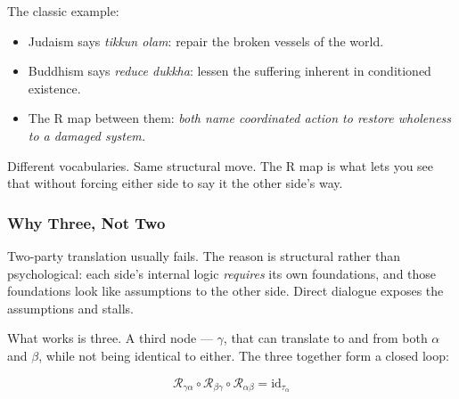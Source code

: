 \documentclass[
]{article}
\providecommand{\tightlist}{%
  \setlength{\itemsep}{0pt}\setlength{\parskip}{0pt}}
\begin{document}
The classic example:

\begin{itemize}
\tightlist
\item
  Judaism says \emph{tikkun olam}: repair the broken vessels of the
  world.
\item
  Buddhism says \emph{reduce dukkha}: lessen the suffering inherent in
  conditioned existence.
\item
  The R map between them: \emph{both name coordinated action to restore
  wholeness to a damaged system.}
\end{itemize}

Different vocabularies. Same structural move. The R map is what lets you
see that without forcing either side to say it the other side's way.

\subsubsection{Why Three, Not Two}\label{why-three-not-two}

Two-party translation usually fails. The reason is structural rather
than psychological: each side's internal logic \emph{requires} its own
foundations, and those foundations look like assumptions to the other
side. Direct dialogue exposes the assumptions and stalls.

What works is three. A third node --- \(\gamma\), that can translate to and from
both \(\alpha\) and \(\beta\), while not being identical to either. The three together
form a closed loop:

\[\mathcal{R}_{\gamma\alpha} \circ \mathcal{R}_{\beta\gamma} \circ \mathcal{R}_{\alpha\beta} = \mathrm{id}_{\tau_\alpha}\]

\begin{center}
\end{center}
\end{document}
